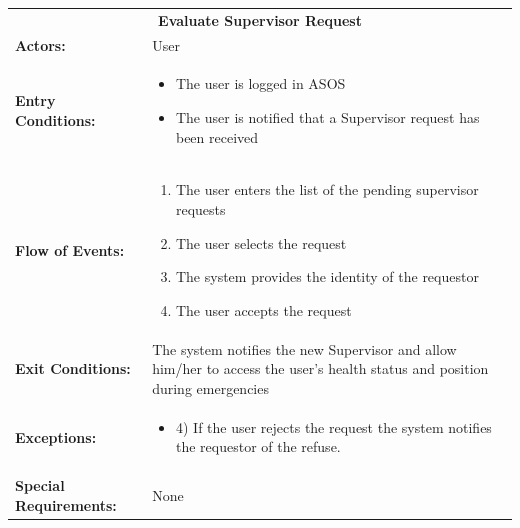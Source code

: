 \begin{table}[htb]
	\centering
	{\renewcommand{\arraystretch}{1.5}%
		\begin{tabular}{|@{\hspace{2em}} p{4cm} @{}| p{11cm} @{\qquad}|}
			\cline{1-2}
			\multicolumn{2}{|c|}{\textbf{Evaluate Supervisor Request}} \\ \cline{1-2}
			\textbf{Actors:} & User \\ \cline{1-2}
			\textbf{Entry Conditions:} & \begin{itemize}[topsep=0em, itemsep=-0.2em]
				\item The user is logged in ASOS
				\item The user is notified that a Supervisor request has been received
			\end{itemize} \\ \cline{1-2}
			\textbf{Flow of Events:} & \begin{enumerate}[topsep=0em, itemsep=-0.2em]
				\item The user enters the list of the pending supervisor requests
				\item The user selects the request
				\item The system provides the identity of the requestor
				\item The user accepts the request
			\end{enumerate}\\ \cline{1-2}
			\textbf{Exit Conditions:} & The system notifies the new Supervisor and allow him/her to access the user's health status and position during emergencies  \\ \cline{1-2}
			\textbf{Exceptions:} & \begin{itemize}
				\item 4) If the user rejects the request the system notifies the requestor of the refuse.
			\end{itemize} \\ \cline{1-2}
			\textbf{Special Requirements:} & None \\ \cline{1-2}
	\end{tabular}} \quad
\end{table}

